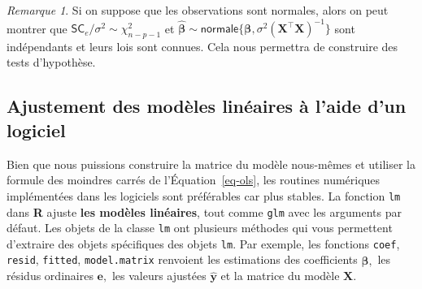 \documentclass[
  11pt,
  letterpaper,
]{scrbook}
\theoremstyle{plain}
\theoremstyle{plain}
\theoremstyle{definition}
\theoremstyle{definition}
\theoremstyle{remark}
\newtheorem{refremark}{Remarque}[chapter]
\begin{document}
\begin{refremark}
Si on suppose que les observations sont normales, alors on peut montrer
que \(\mathsf{SC}_e/\sigma^2 \sim \chi^2_{n-p-1}\) et
\(\widehat{\boldsymbol{\beta}} \sim \mathsf{normale}\{\boldsymbol{\beta}, \sigma^2(\mathbf{X}^\top\mathbf{X})^{-1}\}\)
sont indépendants et leurs lois sont connues. Cela nous permettra de
construire des tests d'hypothèse.

\label{rem-independance}

\end{refremark}

\subsection{Ajustement des modèles linéaires à l'aide d'un
logiciel}\label{ajustement-des-moduxe8les-linuxe9aires-uxe0-laide-dun-logiciel}

Bien que nous puissions construire la matrice du modèle nous-mêmes et
utiliser la formule des moindres carrés de l'Équation~\ref{eq-ols}, les
routines numériques implémentées dans les logiciels sont préférables car
plus stables. La fonction \texttt{lm} dans \textbf{R} ajuste \textbf{les
modèles linéaires}, tout comme \texttt{glm} avec les arguments par
défaut. Les objets de la classe \texttt{lm} ont plusieurs méthodes qui
vous permettent d'extraire des objets spécifiques des objets
\texttt{lm}. Par exemple, les fonctions \texttt{coef}, \texttt{resid},
\texttt{fitted}, \texttt{model.matrix} renvoient les estimations des
coefficients \(\widehat{\boldsymbol{\beta}},\) les résidus ordinaires
\(\boldsymbol{e},\) les valeurs ajustées \(\widehat{\boldsymbol{y}}\) et
la matrice du modèle \(\mathbf{X}.\)
\end{document}
